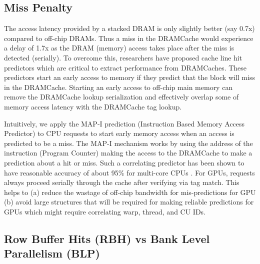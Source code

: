 \subsection{Miss Penalty}
The access latency provided by a stacked DRAM is only slightly better (say 0.7x) compared to off-chip DRAMs. Thus a miss in the DRAMCache would experience a delay of 1.7x as the DRAM (memory) access takes place after the miss is detected (serially). To overcome this, researchers have proposed cache line hit predictors \cite{loh-hill,alloy} which are critical to extract performance from DRAMCaches. These predictors start an early access to memory if they predict that the block will miss in the DRAMCache. Starting an early access to off-chip main memory can remove the DRAMCache lookup serialization and effectively overlap some of memory access latency with the DRAMCache tag lookup.
\par Intuitively, we apply the MAP-I prediction (Instruction Based Memory Access Predictor) \cite{alloy} to CPU requests to start early memory access when an access is predicted to be a miss. The MAP-I mechanism works by using the address of the instruction (Program Counter) making the access to the DRAMCache to make a prediction about a hit or miss. Such a correlating predictor has been shown to have reasonable accuracy of about 95\% for multi-core CPUs \cite{alloy}. For GPUs, requests always proceed serially through the cache after verifying via tag match. This helps to (a) reduce the wastage of off-chip bandwidth for mis-predictions for GPU (b) avoid large structures that will be required for making reliable predictions for GPUs which might require correlating warp, thread, and CU IDs.

\subsection{Row Buffer Hits (RBH) vs Bank Level Parallelism (BLP)} 

